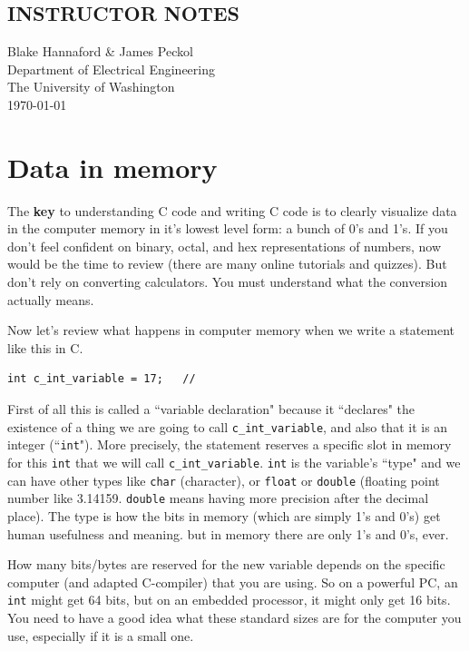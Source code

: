 \documentclass{article}	%
\begin{document}
\subsection*{INSTRUCTOR NOTES}	%
\noindent	%
 Blake Hannaford \& James Peckol\\
        Department of Electrical Engineering \\
        The University of Washington\\
         \today

\section{Data in memory}

The {\bf key} to understanding C code and writing C code is to clearly visualize data in the computer memory in it's lowest level form: 
a bunch of 0's and 1's.  
If you don't feel confident on binary, octal, and hex representations	%
of numbers, now would be the time to review (there are many  online tutorials and quizzes). 
But don't rely on converting calculators.  You must understand what the conversion actually means. 

Now let's review what happens in computer memory when we write a statement like this in C.
\begin{verbatim}
int c_int_variable = 17;   // 
\end{verbatim}

First of all this is called a ``variable declaration" because it ``declares" the existence
of a thing we are going to call {\tt c\_int\_variable}, and also that it is an 
integer (``{\tt int}").  More precisely, the statement reserves a specific slot in memory
for this {\tt int} that we will call  {\tt c\_int\_variable}. {\tt int} is the variable's ``type" and we can have other types like
{\tt char} (character), or {\tt float} or {\tt double} (floating point number like 3.14159. {\tt double} means having more precision after the decimal place).  The type is 
how the bits in memory (which are simply 1's and 0's) get human usefulness and meaning.  but 
in memory there are only 1's and 0's, ever.

How many bits/bytes are reserved for the new variable depends on the specific computer 
(and adapted C-compiler) that you are using.   So on a powerful PC, an {\tt int} might
get 64 bits, but on an embedded processor, it might only get 16 bits.   
You need to have a good idea what these standard sizes are for the computer you use,
especially if it is a small one. 
\end{document}

